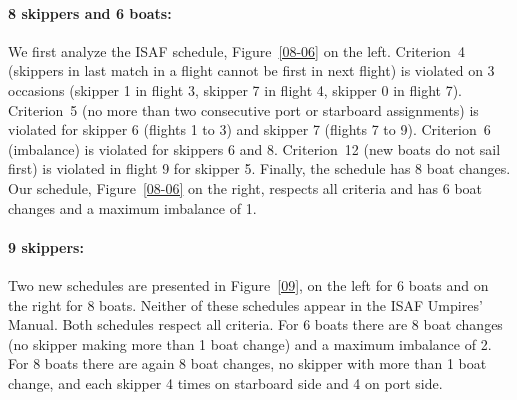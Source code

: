 \documentclass{llncs}
\begin{document}
\paragraph{8 skippers and 6 boats:} We first analyze the ISAF schedule, Figure~\ref{08-06} on the
left. Criterion~4 (skippers in last match in a flight cannot be first in next flight) is violated on
3 occasions (skipper 1 in flight 3, skipper 7 in flight 4, skipper 0 in flight 7). Criterion~5 (no
more than two consecutive port or starboard assignments) is violated for skipper 6 (flights 1 to 3)
and skipper 7 (flights 7 to 9). Criterion~6 (imbalance) is violated for skippers 6 and 8. Criterion~12  (new
boats do not sail first) is violated in flight 9 for skipper 5. Finally, the schedule has 8 boat
changes. Our schedule, Figure~\ref{08-06} on the right, respects all criteria and has 6 boat changes
and a maximum imbalance of 1.

\paragraph{9 skippers:} Two new schedules are presented in Figure~\ref{09}, on the left for 6 boats
and on the right for 8 boats. Neither of these schedules appear in the ISAF Umpires' Manual. Both
schedules respect all criteria. For 6 boats there are 8 boat changes (no skipper making more than 1
boat change) and a maximum imbalance of 2. For 8 boats there are again 8 boat changes, no skipper
with more than 1 boat change, and each skipper 4 times on starboard side and 4 on port side.
\end{document}
